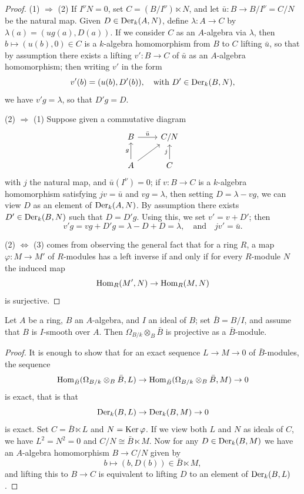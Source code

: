 \begin{proof}
(1) $\Rightarrow$ (2) If $I^\nu N = 0$, set $C = (B/I^\nu) \ltimes N$, and let
$\bar{u}\colon B \to B/I^\nu = C/N$ be the natural map. Given $D \in \operatorname{Der}_k(A, N)$, define
$\lambda\colon A \to C$ by $\lambda(a) = (ug(a), D(a))$. If we consider $C$ as an $A$-algebra via
$\lambda$, then $b \mapsto (u(b), 0) \in C$ is a $k$-algebra homomorphism from $B$ to $C$
lifting $\bar{u}$, so that by assumption there exists a lifting $v'\colon B \to C$ of $\bar{u}$ as an
$A$-algebra homomorphism; then writing $v'$ in the form
\[
  v'(b) = (u(b), D'(b)), \quad \text{with } D' \in \operatorname{Der}_k(B, N),
\]
we have $v'g = \lambda$, so that $D'g = D$.

(2) $\Rightarrow$ (1) Suppose given a commutative diagram
\[
\begin{tikzcd}
B \arrow[r, "\bar{u}"] & C/N \\
A \arrow[u, "g"] \arrow[ru, ""] & C \arrow[u, "j"]
\end{tikzcd}
\]
with $j$ the natural map, and $\bar{u}(I^\nu) = 0$; if $v\colon B \to C$ is a $k$-algebra
homomorphism satisfying $jv = \bar{u}$ and $vg = \lambda$, then setting $D = \lambda - vg$, we
can view $D$ as an element of $\operatorname{Der}_k(A, N)$. By assumption there exists
$D' \in \operatorname{Der}_k(B, N)$ such that $D = D'g$. Using this, we set $v' = v + D'$; then
\[
  v'g = vg + D'g = \lambda - D + D = \lambda, \quad \text{and} \quad jv' = \bar{u}.
\]

(2) $\Leftrightarrow$ (3) comes from observing the general fact that for a ring $R$, a map
$\varphi\colon M \to M'$ of $R$-modules has a left inverse if and only if for every $R$-module
$N$ the induced map
\[
  \operatorname{Hom}_R(M', N) \to \operatorname{Hom}_R(M, N)
\]
is surjective.
\end{proof}

\begin{theorem}\label{thm:28.5}
Let $A$ be a ring, $B$ an $A$-algebra, and $I$ an ideal of $B$; set $\bar{B} = B/I$, and
assume that $B$ is $I$-smooth over $A$. Then $\Omega_{B/k} \otimes_B \bar{B}$ is projective as
a $\bar{B}$-module.
\end{theorem}

\begin{proof}
It is enough to show that for an exact sequence $L \to M \to 0$ of $\bar{B}$-modules, the
sequence
\[
  \operatorname{Hom}_{\bar{B}}(\Omega_{B/k} \otimes_B \bar{B}, L) \to \operatorname{Hom}_{\bar{B}}(\Omega_{B/k} \otimes_B \bar{B}, M) \to 0
\]
is exact, that is that
\[
  \operatorname{Der}_k(B, L) \to \operatorname{Der}_k(B, M) \to 0
\]
is exact. Set $C = \bar{B} \ltimes L$ and $N = \operatorname{Ker} \varphi$. If we view both $L$ and $N$ as
ideals of $C$, we have $L^2 = N^2 = 0$ and $C/N \cong \bar{B} \ltimes M$. Now for any
$D \in \operatorname{Der}_k(B, M)$ we have an $A$-algebra homomorphism $B \to C/N$ given by
\[
  b \mapsto (b, D(b)) \in \bar{B} \ltimes M,
\]
and lifting this to $B \to C$ is equivalent to lifting $D$ to an element of
$\operatorname{Der}_k(B, L)$.
\end{proof}

